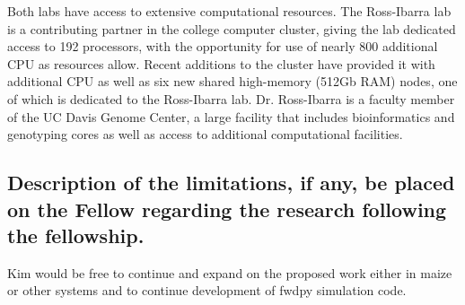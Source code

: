 Both labs have access to extensive computational resources. The Ross-Ibarra lab is a contributing partner in the college  computer cluster, giving the lab dedicated access to 192 processors, with the opportunity for use of nearly 800 additional CPU as resources allow. Recent additions to the cluster have provided it with additional CPU as well as six new shared high-memory (512Gb RAM) nodes, one of which is dedicated to the Ross-Ibarra lab. Dr. Ross-Ibarra is a faculty member of the UC Davis Genome Center, a large facility that includes bioinformatics and genotyping cores as well as access to additional computational facilities. 

\subsection{Description of the limitations, if any, be placed on the Fellow regarding the research following the fellowship.}
Kim would be free to continue and expand on the proposed work either in maize or other systems and to continue development of fwdpy simulation code.
%